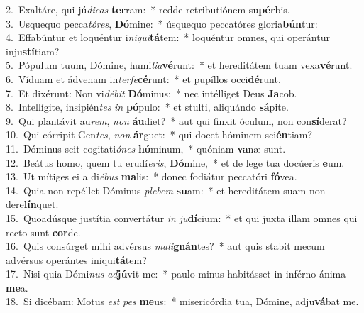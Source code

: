 {2.~}Exaltáre, qui jú\textit{di}\textit{cas} \textbf{ter}ram:~* redde retributiónem su\textbf{pér}bis.\\
{3.~}Usquequo pecca\textit{tó}\textit{res}, \textbf{Dó}mine:~* úsquequo peccatóres gloria\textbf{bún}tur:\\
{4.~}Effabúntur et loquéntur i\textit{ni}\textit{qui}\textbf{tá}tem:~* loquéntur omnes, qui operántur inju\textbf{stí}tiam?\\
{5.~}Pópulum tuum, Dómine, humi\textit{li}\textit{a}\textbf{vé}runt:~* et hereditátem tuam vexa\textbf{vé}runt.\\
{6.~}Víduam et ádvenam in\textit{ter}\textit{fe}\textbf{cé}runt:~* et pupíllos occi\textbf{dé}runt.\\
{7.~}Et dixérunt: Non vi\textit{dé}\textit{bit} \textbf{Dó}minus:~* nec intélliget Deus \textbf{Ja}cob.\\
{8.~}Intellígite, insipién\textit{tes} \textit{in} \textbf{pó}pulo:~* et stulti, aliquándo \textbf{sá}pite.\\
{9.~}Qui plantávit au\textit{rem}, \textit{non} \textbf{áu}diet?~* aut qui finxit óculum, non con\textbf{sí}derat?\\
{10.~}Qui córripit Gen\textit{tes}, \textit{non} \textbf{ár}guet:~* qui docet hóminem sci\textbf{én}tiam?\\
{11.~}Dóminus scit cogitati\textit{ó}\textit{nes} \textbf{hó}minum,~* quóniam \textbf{va}næ sunt.\\
{12.~}Beátus homo, quem tu erudí\textit{e}\textit{ris}, \textbf{Dó}mine,~* et de lege tua docúeris \textbf{e}um.\\
{13.~}Ut mítiges ei a di\textit{é}\textit{bus} \textbf{ma}lis:~* donec fodiátur peccatóri \textbf{fó}vea.\\
{14.~}Quia non repéllet Dóminus \textit{ple}\textit{bem} \textbf{su}am:~* et hereditátem suam non dere\textbf{lín}quet.\\
{15.~}Quoadúsque justítia convertátur \textit{in} \textit{ju}\textbf{dí}cium:~* et qui juxta illam omnes qui recto sunt \textbf{cor}de.\\
{16.~}Quis consúrget mihi advérsus \textit{ma}\textit{li}\textbf{gnán}tes?~* aut quis stabit mecum advérsus operántes iniqui\textbf{tá}tem?\\
{17.~}Nisi quia Dómi\textit{nus} \textit{ad}\textbf{jú}vit me:~* paulo minus habitásset in inférno ánima \textbf{me}a.\\
{18.~}Si dicébam: Motus \textit{est} \textit{pes} \textbf{me}us:~* misericórdia tua, Dómine, adju\textbf{vá}bat me.\\
